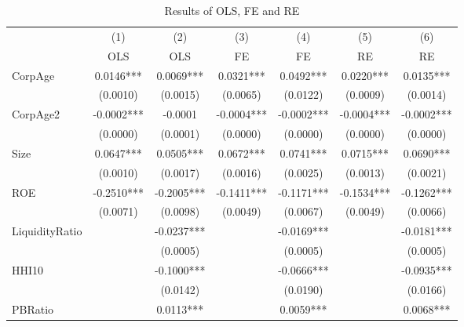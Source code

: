 \begin{table}[htbp]\centering
\def\sym#1{\ifmmode^{#1}\else\(^{#1}\)\fi}
\caption{Results of OLS, FE and RE \label{tab:regression}}
\begin{tabular}{l*{6}{c}}
\hline\hline
            &\multicolumn{1}{c}{(1)}&\multicolumn{1}{c}{(2)}&\multicolumn{1}{c}{(3)}&\multicolumn{1}{c}{(4)}&\multicolumn{1}{c}{(5)}&\multicolumn{1}{c}{(6)}\\
            &\multicolumn{1}{c}{OLS}&\multicolumn{1}{c}{OLS}&\multicolumn{1}{c}{FE}&\multicolumn{1}{c}{FE}&\multicolumn{1}{c}{RE}&\multicolumn{1}{c}{RE}\\
\hline
CorpAge     &      0.0146***&      0.0069***&      0.0321***&      0.0492***&      0.0220***&      0.0135***\\
            &    (0.0010)   &    (0.0015)   &    (0.0065)   &    (0.0122)   &    (0.0009)   &    (0.0014)   \\
[1em]
CorpAge2    &     -0.0002***&     -0.0001   &     -0.0004***&     -0.0002***&     -0.0004***&     -0.0002***\\
            &    (0.0000)   &    (0.0001)   &    (0.0000)   &    (0.0000)   &    (0.0000)   &    (0.0000)   \\
[1em]
Size        &      0.0647***&      0.0505***&      0.0672***&      0.0741***&      0.0715***&      0.0690***\\
            &    (0.0010)   &    (0.0017)   &    (0.0016)   &    (0.0025)   &    (0.0013)   &    (0.0021)   \\
[1em]
ROE         &     -0.2510***&     -0.2005***&     -0.1411***&     -0.1171***&     -0.1534***&     -0.1262***\\
            &    (0.0071)   &    (0.0098)   &    (0.0049)   &    (0.0067)   &    (0.0049)   &    (0.0066)   \\
[1em]
LiquidityRatio&               &     -0.0237***&               &     -0.0169***&               &     -0.0181***\\
            &               &    (0.0005)   &               &    (0.0005)   &               &    (0.0005)   \\
[1em]
HHI10       &               &     -0.1000***&               &     -0.0666***&               &     -0.0935***\\
            &               &    (0.0142)   &               &    (0.0190)   &               &    (0.0166)   \\
[1em]
PBRatio     &               &      0.0113***&               &      0.0059***&               &      0.0068***\\

\end{tabular}
\end{table}
